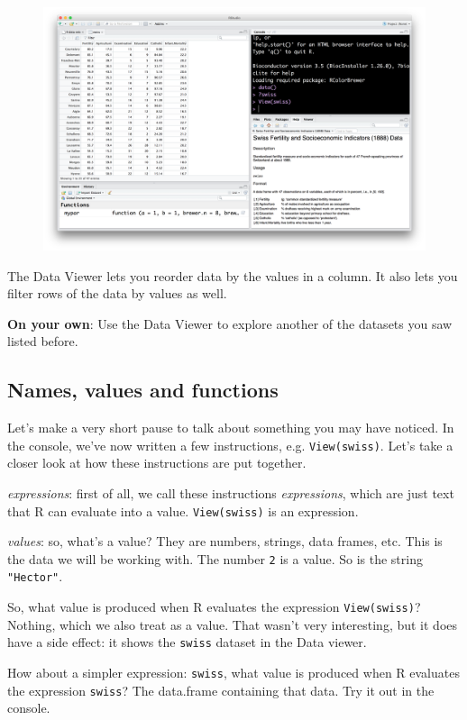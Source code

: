 \documentclass[12pt,]{book}
\theoremstyle{definition}
\theoremstyle{definition}
\theoremstyle{remark}
\begin{document}
\begin{figure}
\centering
\includegraphics{img/rstudio_view_swiss.png}
\caption{}
\end{figure}

The Data Viewer lets you reorder data by the values in a column. It also
lets you filter rows of the data by values as well.

\textbf{On your own}: Use the Data Viewer to explore another of the
datasets you saw listed before.

\subsection{Names, values and
functions}\label{names-values-and-functions}

Let's make a very short pause to talk about something you may have
noticed. In the console, we've now written a few instructions, e.g.
\texttt{View(swiss)}. Let's take a closer look at how these instructions
are put together.

\emph{expressions}: first of all, we call these instructions
\emph{expressions}, which are just text that R can evaluate into a
value. \texttt{View(swiss)} is an expression.

\emph{values}: so, what's a value? They are numbers, strings, data
frames, etc. This is the data we will be working with. The number
\texttt{2} is a value. So is the string \texttt{"Hector"}.

So, what value is produced when R evaluates the expression
\texttt{View(swiss)}? Nothing, which we also treat as a value. That
wasn't very interesting, but it does have a side effect: it shows the
\texttt{swiss} dataset in the Data viewer.

How about a simpler expression: \texttt{swiss}, what value is produced
when R evaluates the expression \texttt{swiss}? The data.frame
containing that data. Try it out in the console.
\end{document}

